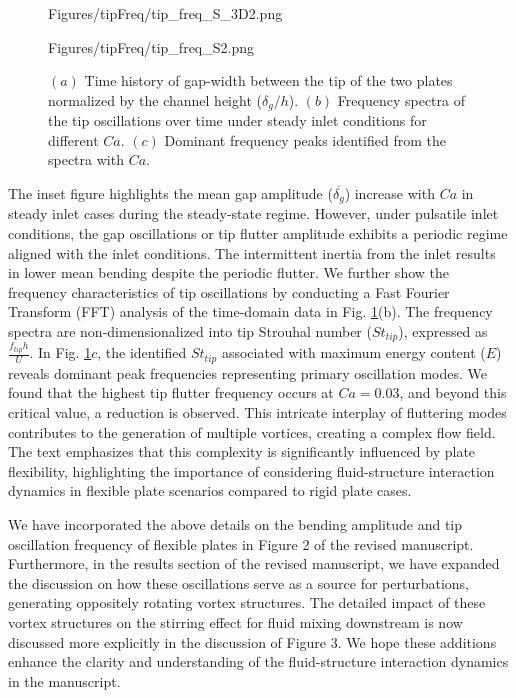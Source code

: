 \documentclass[onecolumn,a4paper,amsmath,amssym,pre]{revtex4}
\begin{document}
\begin{enumerate}
\begin{figure}[h!]
\begin{center}
\begin{minipage}[c]{0.3\linewidth}
\begin{overpic}[width=1\linewidth]{Figures/tipFreq/tip_freq_S_3D2.png}
								\end{overpic}
							\end{minipage} 
							\begin{minipage}[c]{0.3\linewidth}	
								\centering
								\begin{overpic}[width=0.97\linewidth]{Figures/tipFreq/tip_freq_S2.png} 
								\end{overpic}
							\end{minipage} 
						\end{center}
						\vspace{-10px}
						\caption{$(a)$ Time history of gap-width between the tip of the two plates normalized by the channel height ($\delta_g/h$). $(b)$ Frequency spectra of the tip oscillations over time under steady inlet conditions for different $Ca$. $(c)$ Dominant frequency peaks identified from the spectra with $Ca$. }
						\label{fig:del_g_vs_Ca_steady}
					\end{figure}
					The inset figure highlights the mean gap amplitude ($\overline{\delta_g}$) increase with $Ca$ in steady inlet cases during the steady-state regime. However, under pulsatile inlet conditions, the gap oscillations or tip flutter amplitude exhibits a periodic regime aligned with the inlet conditions. The intermittent inertia from the inlet results in lower mean bending despite the periodic flutter. We further show the frequency characteristics of tip oscillations by conducting a Fast Fourier Transform (FFT) analysis of the time-domain data in Fig. \ref{fig:del_g_vs_Ca_steady}(b). The frequency spectra are non-dimensionalized into tip Strouhal number ($St_{tip}$), expressed as $\frac{f_{tip}h}{U}$. In Fig. \ref{fig:del_g_vs_Ca_steady}$c$, the identified $St_{tip}$ associated with maximum energy content ($E$) reveals dominant peak frequencies representing primary oscillation modes. We found that the highest tip flutter frequency occurs at $Ca=0.03$, and beyond this critical value, a reduction is observed. This intricate interplay of fluttering modes contributes to the generation of multiple vortices, creating a complex flow field. The text emphasizes that this complexity is significantly influenced by plate flexibility, highlighting the importance of considering fluid-structure interaction dynamics in flexible plate scenarios compared to rigid plate cases.
					
					
					We have incorporated the above details on the bending amplitude and tip oscillation frequency of flexible plates in Figure 2 of the revised manuscript. Furthermore, in the results section of the revised manuscript, we have expanded the discussion on how these oscillations serve as a source for perturbations, generating oppositely rotating vortex structures. The detailed impact of these vortex structures on the stirring effect for fluid mixing downstream is now discussed more explicitly in the discussion of Figure 3. We hope these additions enhance the clarity and understanding of the fluid-structure interaction dynamics in the manuscript. 
					

\end{enumerate}
\end{document}
